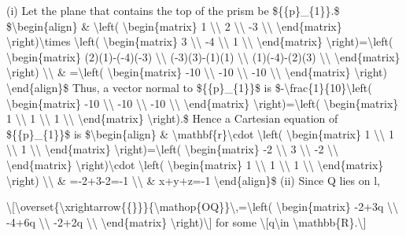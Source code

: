 \item {}

(i) Let the plane that contains the top of the prism be \$\{\{p\}\_\{1\}\}.\$
\$\textbackslash begin\{align\} \& \textbackslash left( \textbackslash begin\{matrix\}
1 \textbackslash\textbackslash{} 2 \textbackslash\textbackslash{}
-3 \textbackslash\textbackslash{} \textbackslash end\{matrix\}
\textbackslash right)\textbackslash times \textbackslash left(
\textbackslash begin\{matrix\} 3 \textbackslash\textbackslash{}
-4 \textbackslash\textbackslash{} 1 \textbackslash\textbackslash{}
\textbackslash end\{matrix\} \textbackslash right)=\textbackslash left(
\textbackslash begin\{matrix\} (2)(1)-(-4)(-3) \textbackslash\textbackslash{}
(-3)(3)-(1)(1) \textbackslash\textbackslash{} (1)(-4)-(2)(3) \textbackslash\textbackslash{}
\textbackslash end\{matrix\} \textbackslash right) \textbackslash\textbackslash{}
\& =\textbackslash left( \textbackslash begin\{matrix\} -10 \textbackslash\textbackslash{}
-10 \textbackslash\textbackslash{} -10 \textbackslash\textbackslash{}
\textbackslash end\{matrix\} \textbackslash right) \textbackslash end\{align\}\$
Thus, a vector normal to \$\{\{p\}\_\{1\}\}\$ is \$-\textbackslash frac\{1\}\{10\}\textbackslash left(
\textbackslash begin\{matrix\} -10 \textbackslash\textbackslash{}
-10 \textbackslash\textbackslash{} -10 \textbackslash\textbackslash{}
\textbackslash end\{matrix\} \textbackslash right)=\textbackslash left(
\textbackslash begin\{matrix\} 1 \textbackslash\textbackslash{}
1 \textbackslash\textbackslash{} 1 \textbackslash\textbackslash{}
\textbackslash end\{matrix\} \textbackslash right).\$ Hence a Cartesian
equation of \$\{\{p\}\_\{1\}\}\$ is \$\textbackslash begin\{align\}
\& \textbackslash mathbf\{r\}\textbackslash cdot \textbackslash left(
\textbackslash begin\{matrix\} 1 \textbackslash\textbackslash{}
1 \textbackslash\textbackslash{} 1 \textbackslash\textbackslash{}
\textbackslash end\{matrix\} \textbackslash right)=\textbackslash left(
\textbackslash begin\{matrix\} -2 \textbackslash\textbackslash{}
3 \textbackslash\textbackslash{} -2 \textbackslash\textbackslash{}
\textbackslash end\{matrix\} \textbackslash right)\textbackslash cdot
\textbackslash left( \textbackslash begin\{matrix\} 1 \textbackslash\textbackslash{}
1 \textbackslash\textbackslash{} 1 \textbackslash\textbackslash{}
\textbackslash end\{matrix\} \textbackslash right) \textbackslash\textbackslash{}
\& =-2+3-2=-1 \textbackslash\textbackslash{} \& x+y+z=-1 \textbackslash end\{align\}\$
(ii) Since Q lies on l, 

\textbackslash{[}\textbackslash overset\{\textbackslash xrightarrow\{\{\}\}\}\{\textbackslash mathop\{OQ\}\}\textbackslash ,=\textbackslash left(
\textbackslash begin\{matrix\} -2+3q \textbackslash\textbackslash{}
-4+6q \textbackslash\textbackslash{} -2+2q \textbackslash\textbackslash{}
\textbackslash end\{matrix\} \textbackslash right)\textbackslash{]}
for some \textbackslash{[}q\textbackslash in \textbackslash mathbb\{R\}.\textbackslash{]}

